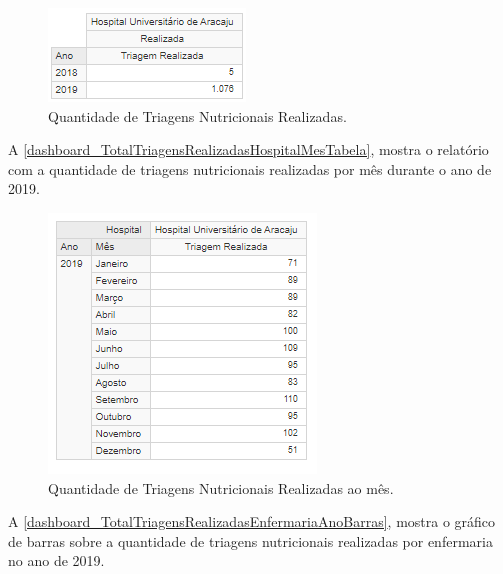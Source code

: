 \begin{figure}[htb]
	\caption{\label{dashboard_TotalTriagensRealizadasHospitalAnoTabela}Quantidade de Triagens Nutricionais Realizadas.}
	\begin{center}
	    \includegraphics[scale=1.05]{Imagens/1.1.TotalTriagensRealizadasHospitalAnoTabela.png}
	\end{center}
\end{figure}

A \autoref{dashboard_TotalTriagensRealizadasHospitalMesTabela}, mostra o relatório com a quantidade de triagens nutricionais realizadas por mês durante o ano de 2019. 

\begin{figure}[htb]
	\caption{\label{dashboard_TotalTriagensRealizadasHospitalMesTabela}Quantidade de Triagens Nutricionais Realizadas ao mês.}
	\begin{center}
	    \includegraphics[scale=1.05]{Imagens/1.2.TotalTriagensRealizadasHospitalMesTabela.png}
	\end{center}
\end{figure}

A \autoref{dashboard_TotalTriagensRealizadasEnfermariaAnoBarras}, mostra o gráfico de barras sobre a quantidade de triagens nutricionais realizadas por enfermaria no ano de 2019.

